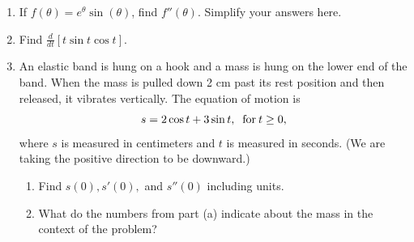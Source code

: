 \documentclass[11pt,fleqn]{article}
\begin{document}
\begin{enumerate}
\item If $f(\theta) = e^{\theta} \sin(\theta)$, find $f '' (\theta).$ Simplify your answers here. 
\vfill
\item Find $\displaystyle{\frac{d}{dt}\left[t \sin t \cos t\right]}$. 
\vfill 
\item An elastic band is hung on a hook and a mass is hung on the lower end of the band. When the mass is pulled down 2 cm past its rest position and then released, it vibrates vertically. The equation of motion is $$s=2 \cos t +3 \sin t, \text{\: for\:} t \geq 0,$$ where $s$ is measured in centimeters and $t$ is measured in seconds. (We are taking the positive direction to be downward.)
\begin{enumerate}
\item Find $s(0), s'(0),$ and $s''(0)$ including units.
\vfill
\item What do the numbers from part (a) indicate about the mass in the context of the problem?
\vfill
\end{enumerate}


\end{enumerate}
\end{document}
